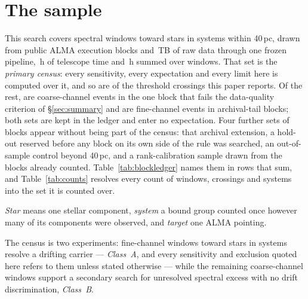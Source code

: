 \section{The sample}
\label{sec:sample}

This search covers \NWindows{} spectral windows toward \NStars{}
stars in \NSystems{} systems within 40\,pc, drawn from \NEB{}
public ALMA execution blocks and \TotalDataTB\,TB of raw data through one
frozen pipeline, \StTelHours\,h of telescope time and \LdgCensusHours\,h
summed over windows. That set is the \emph{primary census}: every
sensitivity, every expectation and every limit here is computed over it, and
so are \MtCrossACen{} of the \EvNCrossRaw{} threshold crossings this paper
reports. Of the rest, \LdgNCrossB{} are coarse-channel events in the one
block that fails the data-quality criterion of \S\ref{sec:summary} and
\CeNTailCross{} are fine-channel events in archival-tail blocks; both sets
are kept in the ledger and enter no expectation. Four further sets of blocks
appear without being part of the census: that archival extension, a hold-out
reserved before any block on its own side of the rule was searched, an
out-of-sample control beyond 40\,pc, and a rank-calibration sample drawn from
the blocks already counted. Table~\ref{tab:blockledger} names them in rows
that sum, and Table~\ref{tab:counts} resolves every count of windows,
crossings and systems into the set it is counted over.

\emph{Star} means one stellar component, \emph{system} a bound group
counted once however many of its components were observed, and \emph{target}
one ALMA pointing.

The census is two experiments: \NWinA{} fine-channel windows toward
\LdgClassAStars{} stars in \NSysClassA{} systems resolve a drifting carrier
--- \emph{Class~A}, and every sensitivity and exclusion quoted here refers to
them unless stated otherwise --- while the remaining \NWinB{} coarse-channel
windows support a secondary search for unresolved spectral excess with no
drift discrimination, \emph{Class~B}.

